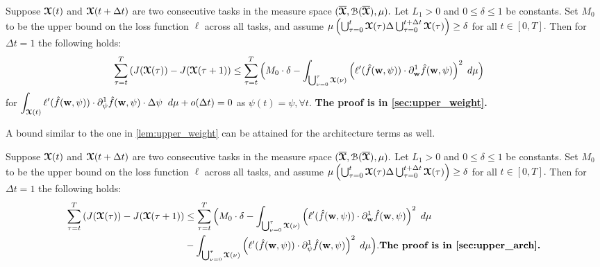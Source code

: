 \begin{lemma}\label{lem:upper_weight}
    Suppose $\boldsymbol{\mathcal{X}}(t)$ and $\boldsymbol{\mathcal{X}}(t+\Delta t)$ are two consecutive tasks in the measure space $(\overline{\boldsymbol{\mathcal{X}}}, \mathcal{B}(\overline{\boldsymbol{\mathcal{X}}}),\mu).$ Let $L_1>0$ and $0\leq \delta\leq 1$  be constants. Set $M_0$ to be the upper bound on the loss function $\ell$ across all tasks, and assume $\mu\left( \bigcup_{\tau = 0}^{t}\boldsymbol{\mathcal{X}}(\tau)\Delta \bigcup_{\tau = 0}^{t+\Delta t}\boldsymbol{\mathcal{X}}(\tau)\right)\geq \delta$ for all $t\in [0,T].$ Then for $\Delta t = 1$ the following holds:
    \begin{align*}
        \sum_{\tau = t}^{T} \left(J(\boldsymbol{\mathcal{X}}(\tau))-J(\boldsymbol{\mathcal{X}}(\tau+1)\right)
        & \leq \sum_{\tau =t}^{T} \Big( M_0\cdot \delta - \displaystyle\int_{\bigcup_{\nu = 0}^\tau\boldsymbol{\mathcal{X}}(\nu)} \left(\ell'(\hat{f}(\boldsymbol{\mathrm{w}},\psi))\cdot \partial_{\boldsymbol{\mathrm{w}}}^1 \hat{f}(\boldsymbol{\mathrm{w}},\psi)\right)^2 \hspace{1mm}  d\mu \Big)
    \end{align*}
    for $\displaystyle\int_{\boldsymbol{\mathcal{X}}(t)} \ell'(\hat{f}(\boldsymbol{\mathrm{w}},\psi))\cdot \partial_\psi^1 \hat{f}(\boldsymbol{\mathrm{w}},\psi)\cdot \Delta \psi \; \;  d\mu+ o(\Delta t) = 0$ as $\psi(t) = \psi, \forall t.$ \textbf{
    The proof is in \cref{sec:upper_weight}.}
\end{lemma}
A bound similar to the one in \cref{lem:upper_weight} can be attained for the architecture terms as well. 
\begin{lemma}\label{lem:upper_arch}
    Suppose $\boldsymbol{\mathcal{X}}(t)$ and $\boldsymbol{\mathcal{X}}(t+\Delta t)$ are two consecutive tasks in the measure space $(\overline{\boldsymbol{\mathcal{X}}}, \mathcal{B}(\overline{\boldsymbol{\mathcal{X}}}),\mu).$ Let $L_1>0$ and $0\leq \delta\leq 1$  be constants. Set $M_0$ to be the upper bound on the loss function $\ell$ across all tasks, and assume $\mu\left( \bigcup_{\tau = 0}^{t}\boldsymbol{\mathcal{X}}(\tau)\Delta \bigcup_{\tau = 0}^{t+\Delta t}\boldsymbol{\mathcal{X}}(\tau)\right)\geq \delta$ for all $t\in [0,T].$ Then for $\Delta t = 1$ the following holds:
    \begin{align*}
        \sum_{\tau = t}^{T} \left(J(\tx(\tau))-J(\tx(\tau+1)\right)
        & \leq \sum_{\tau =t}^{T} \Big( M_0\cdot \delta - \displaystyle\int_{\bigcup_{\nu = 0}^\tau\tx(\nu)} \left(\ell'(\hat{f}(\weight,\psi))\cdot \partial_{\weight}^1 \hat{f}(\weight,\psi)\right)^2 \hspace{1mm}  d\mu\\
        & -\displaystyle\int_{\bigcup_{\nu = 0}^\tau\tx(\nu)} \left(\ell'(\hat{f}(\weight,\psi))\cdot \partial_\psi^1 \hat{f}(\weight,\psi)\right)^2\hspace{1mm}  d\mu\Big). \textbf{The proof is  in \cref{sec:upper_arch}.}
    \end{align*}
\end{lemma}

